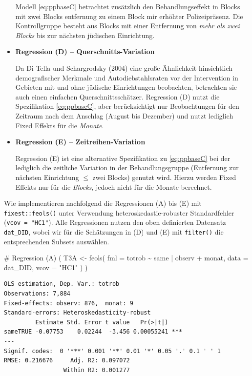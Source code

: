 \documentclass[
  a4paper,
  DIV=11,
  oneside]{scrreprt}
\newenvironment{Shaded}{\begin{snugshade}}{\end{snugshade}}
\newcommand{\AttributeTok}[1]{\textcolor[rgb]{0.40,0.45,0.13}{#1}}
\newcommand{\CommentTok}[1]{\textcolor[rgb]{0.37,0.37,0.37}{#1}}
\newcommand{\FunctionTok}[1]{\textcolor[rgb]{0.28,0.35,0.67}{#1}}
\newcommand{\NormalTok}[1]{\textcolor[rgb]{0.00,0.23,0.31}{#1}}
\newcommand{\OtherTok}[1]{\textcolor[rgb]{0.00,0.23,0.31}{#1}}
\newcommand{\SpecialCharTok}[1]{\textcolor[rgb]{0.37,0.37,0.37}{#1}}
\newcommand{\StringTok}[1]{\textcolor[rgb]{0.13,0.47,0.30}{#1}}
\begin{document}
\begin{itemize}
  Modell \eqref{eq:ppbaseC} betrachtet zusätzlich den Behandlungseffekt
  in Blocks mit zwei Blocks entfernung zu einem Block mir erhöhter
  Polizeipräsenz. Die Kontrollgruppe besteht aus Blocks mit einer
  Entfernung von \emph{mehr als zwei Blocks} bis zur nächsten jüdischen
  Einrichtung.
\item
  \textbf{Regression (D) -- Querschnitts-Variation}

  Da Di Tella und Schargrodsky (2004) eine große Ähnlichkeit
  hinsichtlich demografischer Merkmale und Autodiebstahlsraten vor der
  Intervention in Gebieten mit und ohne jüdische Einrichtungen
  beobachten, betrachten sie auch einen einfachen Querschnittsschätzer.
  Regression (D) nutzt die Spezifikation \eqref{eq:ppbaseC}, aber
  berücksichtigt nur Beobachtungen für den Zeitraum nach dem Anschlag
  (August bis Dezember) und nutzt lediglich Fixed Effekts für die
  \emph{Monate}.
\item
  \textbf{Regression (E) -- Zeitreihen-Variation}

  Regression (E) ist eine alternative Spezifikation zu
  \eqref{eq:ppbaseC} bei der lediglich die zeitliche Variation in der
  Behandlungsgruppe (Entfernung zur nächsten Einrichtung \(\leq\) zwei
  Blocks) genutzt wird. Hierzu werden Fixed Effekts nur für die
  \emph{Blocks}, jedoch nicht für die Monate berechnet.
\end{itemize}

Wie implementieren nachfolgend die Regressionen (A) bis (E) mit
\texttt{fixest::feols()} unter Verwendung heteroskedastie-robuster
Standardfehler (\texttt{vcov\ =\ "HC1"}). Alle Regressionen nutzen den
oben definierten Datensatz \texttt{dat\_DID}, wobei wir für die
Schätzungen in (D) und (E) mit \texttt{filter()} die entsprechenden
Subsets auswählen.

\begin{Shaded}
\begin{Highlighting}[]
\CommentTok{\# Regression (A)}
\NormalTok{(}
\NormalTok{  T3A }\OtherTok{\textless{}{-}} \FunctionTok{feols}\NormalTok{(}
    \AttributeTok{fml =}\NormalTok{ totrob }\SpecialCharTok{\textasciitilde{}} 
\NormalTok{      same}
    \SpecialCharTok{|}\NormalTok{ observ }\SpecialCharTok{+}\NormalTok{ monat, }
    \AttributeTok{data =}\NormalTok{ dat\_DID, }
    \AttributeTok{vcov =} \StringTok{"HC1"}
\NormalTok{  )}
\NormalTok{)}
\end{Highlighting}
\end{Shaded}

\begin{verbatim}
OLS estimation, Dep. Var.: totrob
Observations: 7,884
Fixed-effects: observ: 876,  monat: 9
Standard-errors: Heteroskedasticity-robust 
         Estimate Std. Error t value   Pr(>|t|)    
sameTRUE -0.07753    0.02244  -3.456 0.00055241 ***
---
Signif. codes:  0 '***' 0.001 '**' 0.01 '*' 0.05 '.' 0.1 ' ' 1
RMSE: 0.216676     Adj. R2: 0.097072
                 Within R2: 0.001277
\end{verbatim}
\end{document}
